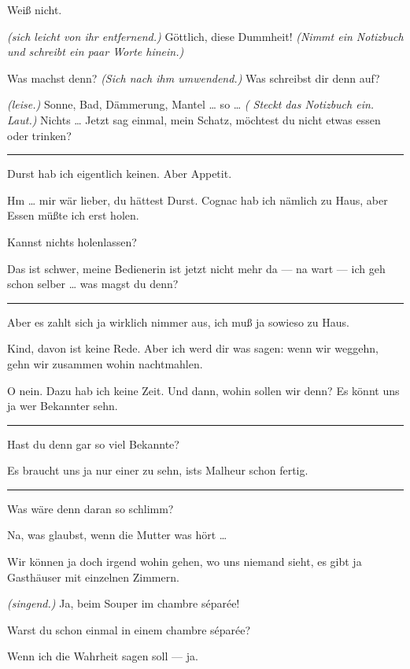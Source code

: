 \documentclass[
	final,
	a4paper,
	ngerman,
	mpinclude = true, %
	twoside = true,
	open = right,
	cleardoublepage = plain,
	DIV = 13,
	BCOR = 1cm,
	titlepage = firstiscover,
	]{scrbook}
\newcommand{\direction}[1]{\textit{(#1)}}
\newenvironment{deletion}{%
		\vspace{0.25\baselineskip}
		\hrule
		\vspace{0.25\baselineskip}
		\color{darkgray}
	}{
		\color{black}
		\vspace{0.25\baselineskip}
		\hrule 
		\vspace{0.25\baselineskip}
	}
\newcommand{\thecharacter}[1]{\textup{\textsc{#1}}\xspace}
\newcommand{\thesuesse}{\thecharacter{Lola}}
\newcommand{\thedichter}{\thecharacter{Robert Bibitz}}
\newcommand{\character}[1]{\item[#1:]}
\newcommand{\suesse}{\character{\thesuesse}}
\newcommand{\dichter}{\character{\thedichter}}
\begin{document}
\begin{play}
	\suesse
	Weiß nicht.

	\dichter
	\direction{sich leicht von ihr entfernend.} Göttlich, diese Dummheit! \direction{Nimmt ein Notizbuch und schreibt ein paar Worte hinein.}

	\suesse
	Was machst denn? \direction{Sich nach ihm umwendend.} Was schreibst dir denn auf?

	\dichter
	\direction{leise.} Sonne, Bad, Dämmerung, Mantel \ldots{} so \ldots{} \direction{ Steckt das Notizbuch ein. Laut.} Nichts \ldots{} Jetzt sag einmal, mein Schatz, möchtest du nicht etwas essen oder trinken?

	\begin{deletion}
	\suesse
	Durst hab ich eigentlich keinen. Aber Appetit.

	\dichter
	Hm \ldots{} mir wär lieber, du hättest Durst. Cognac hab ich nämlich zu Haus, aber Essen müßte ich erst holen.

	\suesse
	Kannst nichts holenlassen?

	\dichter
	Das ist schwer, meine Bedienerin ist jetzt nicht mehr da --- na wart --- ich geh schon selber \ldots{} was magst du denn?
	\end{deletion}

	\suesse
	Aber es zahlt sich ja wirklich nimmer aus, ich muß ja sowieso zu Haus.

	\dichter
	Kind, davon ist keine Rede. Aber ich werd dir was sagen: wenn wir weggehn, gehn wir zusammen wohin nachtmahlen.

	\suesse
	O nein. Dazu hab ich keine Zeit. Und dann, wohin sollen wir denn? Es könnt uns ja wer Bekannter sehn.

	\begin{deletion}
	\dichter
	Hast du denn gar so viel Bekannte?

	\suesse
	Es braucht uns ja nur einer zu sehn, ists Malheur schon fertig.
	\end{deletion}

	\dichter
	Was wäre denn daran so schlimm?

	\suesse
	Na, was glaubst, wenn die Mutter was hört \ldots{}

	\dichter
	Wir können ja doch irgend wohin gehen, wo uns niemand sieht, es gibt ja Gasthäuser mit einzelnen Zimmern.

	\suesse
	\direction{singend.} Ja, beim Souper im chambre séparée!

	\dichter
	Warst du schon einmal in einem chambre séparée?

	\suesse
	Wenn ich die Wahrheit sagen soll --- ja.


\end{play}
\end{document}
